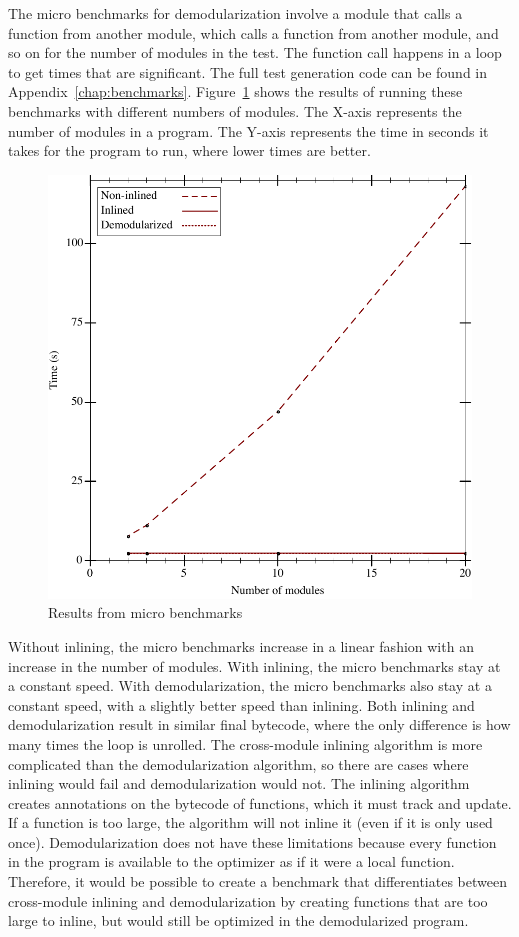 The micro benchmarks for demodularization involve a module that calls a function from another module, which calls a function from another module, and so on for the number of modules in the test. 
The function call happens in a loop to get times that are significant.
The full test generation code can be found in Appendix~\ref{chap:benchmarks}.
Figure~\ref{fig:micro-results} shows the results of running these benchmarks with different numbers of modules.
The X-axis represents the number of modules in a program.
The Y-axis represents the time in seconds it takes for the program to run, where lower times are better.
\begin{figure}
\includegraphics{figures/micro-results}
\caption{Results from micro benchmarks}
\label{fig:micro-results}
\end{figure}
Without inlining, the micro benchmarks increase in a linear fashion with an increase in the number of modules.
With inlining, the micro benchmarks stay at a constant speed.
With demodularization, the micro benchmarks also stay at a constant speed, with a slightly better speed than inlining.
Both inlining and demodularization result in similar final bytecode, where the only difference is how many times the loop is unrolled.
The cross-module inlining algorithm is more complicated than the demodularization algorithm, so there are cases where inlining would fail and demodularization would not. 
The inlining algorithm creates annotations on the bytecode of functions, which it must track and update.
If a function is too large, the algorithm will not inline it (even if it is only used once). 
Demodularization does not have these limitations because every function in the program is available to the optimizer as if it were a local function. 
Therefore, it would be possible to create a benchmark that differentiates between cross-module inlining and demodularization by creating functions that are too large to inline, but would still be optimized in the demodularized program.


